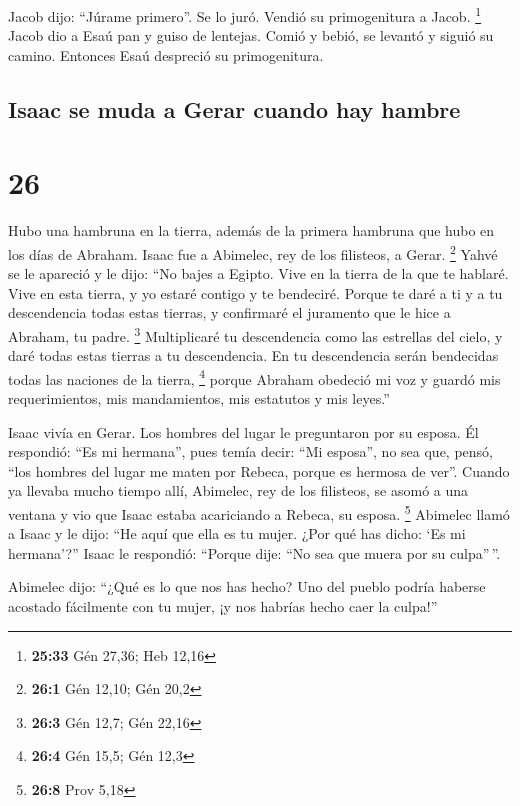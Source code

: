  Jacob dijo: ``Júrame primero''. Se lo juró. Vendió su
primogenitura a Jacob. \footnote{\textbf{25:33} Gén 27,36; Heb 12,16}
 Jacob dio a Esaú pan y guiso de lentejas. Comió y bebió,
se levantó y siguió su camino. Entonces Esaú despreció su primogenitura.

\hypertarget{isaac-se-muda-a-gerar-cuando-hay-hambre}{%
\subsection{Isaac se muda a Gerar cuando hay
hambre}\label{isaac-se-muda-a-gerar-cuando-hay-hambre}}

\hypertarget{section-25}{%
\section{26}\label{section-25}}

 Hubo una hambruna en la tierra, además de la primera
hambruna que hubo en los días de Abraham. Isaac fue a Abimelec, rey de
los filisteos, a Gerar. \footnote{\textbf{26:1} Gén 12,10; Gén 20,2}
 Yahvé se le apareció y le dijo: ``No bajes a Egipto. Vive
en la tierra de la que te hablaré.  Vive en esta tierra, y
yo estaré contigo y te bendeciré. Porque te daré a ti y a tu
descendencia todas estas tierras, y confirmaré el juramento que le hice
a Abraham, tu padre. \footnote{\textbf{26:3} Gén 12,7; Gén 22,16}
 Multiplicaré tu descendencia como las estrellas del
cielo, y daré todas estas tierras a tu descendencia. En tu descendencia
serán bendecidas todas las naciones de la tierra, \footnote{\textbf{26:4}
  Gén 15,5; Gén 12,3}  porque Abraham obedeció mi voz y
guardó mis requerimientos, mis mandamientos, mis estatutos y mis
leyes.''

 Isaac vivía en Gerar.  Los hombres del
lugar le preguntaron por su esposa. Él respondió: ``Es mi hermana'',
pues temía decir: ``Mi esposa'', no sea que, pensó, ``los hombres del
lugar me maten por Rebeca, porque es hermosa de ver''. 
Cuando ya llevaba mucho tiempo allí, Abimelec, rey de los filisteos, se
asomó a una ventana y vio que Isaac estaba acariciando a Rebeca, su
esposa. \footnote{\textbf{26:8} Prov 5,18}  Abimelec llamó
a Isaac y le dijo: ``He aquí que ella es tu mujer. ¿Por qué has dicho:
`Es mi hermana'?'' Isaac le respondió: ``Porque dije: ``No sea que muera
por su culpa''\,''.

 Abimelec dijo: ``¿Qué es lo que nos has hecho? Uno del
pueblo podría haberse acostado fácilmente con tu mujer, ¡y nos habrías
hecho caer la culpa!''

